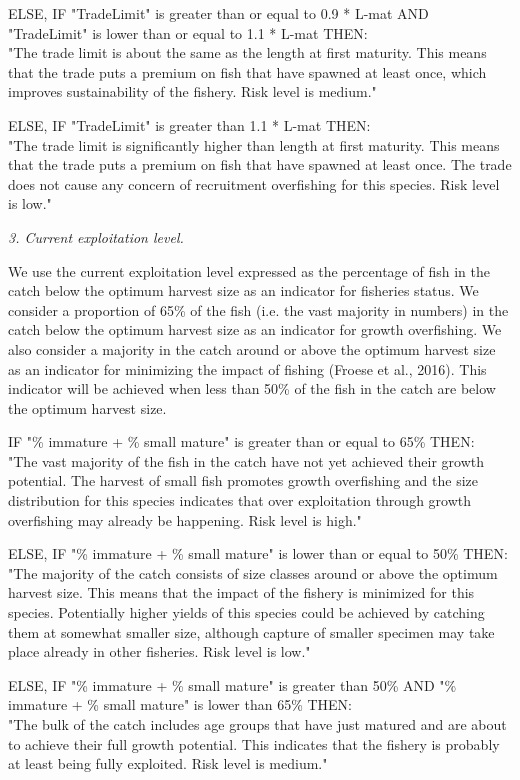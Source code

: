\clearpage
\newpage

ELSE, IF "TradeLimit" is greater than or equal to 0.9 * L-mat AND "TradeLimit" is lower than or equal to 1.1 * L-mat THEN:\\[0cm]
"The trade limit is about the same as the length at first maturity.  This means that the trade puts a premium on fish that have spawned at least once, which improves sustainability of the fishery. Risk level is medium."

ELSE, IF "TradeLimit" is greater than 1.1 * L-mat THEN:\\[0cm]
"The trade limit is significantly higher than length at first maturity.  This means that the trade puts a premium on fish that have spawned at least once. The trade does not cause any concern of recruitment overfishing for this species. Risk level is low."

\textit{3. Current exploitation level.}

We use the current exploitation level expressed as the percentage of fish in the catch below the optimum harvest size as an indicator for fisheries status. We consider a proportion of 65\% of the fish (i.e. the vast majority in numbers) in the catch below the optimum harvest size as an indicator for growth overfishing. We also consider a majority in the catch around or above the optimum harvest size as an indicator for minimizing the impact of fishing (Froese et al., 2016). This indicator will be achieved when less than 50\% of the fish in the catch are below the optimum harvest size.

IF "\% immature + \% small mature" is greater than or equal to 65\% THEN:\\[0cm]
"The vast majority of the fish in the catch have not yet achieved their growth potential. The harvest of small fish promotes growth overfishing and the size distribution for this species indicates that over exploitation through growth overfishing may already be happening. Risk level is high."

ELSE, IF "\% immature + \% small mature" is lower than or equal to 50\% THEN:\\[0cm]
"The majority of the catch consists of size classes around or above the optimum harvest size. This means that the impact of the fishery is minimized for this species. Potentially higher yields of this species could be achieved by catching them at somewhat smaller size, although capture of smaller specimen may take place already in other fisheries. Risk level is low."

ELSE, IF "\% immature + \% small mature" is greater than 50\% AND "\% immature + \% small mature" is lower than 65\% THEN:\\[0cm]
"The bulk of the catch includes age groups that have just matured and are about to achieve their full growth potential. This indicates that the fishery is probably at least being fully exploited. Risk level is medium."

